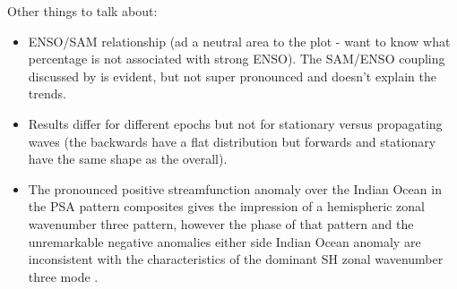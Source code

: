 Other things to talk about:
\begin{itemize}
\item ENSO/SAM relationship (ad a neutral area to the plot - want to know what percentage is not associated with strong ENSO). The SAM/ENSO coupling discussed by \citet{Fogt2006} is evident, but not super pronounced and doesn't explain the trends.
\item Results differ for different epochs but not for stationary versus propagating waves (the backwards have a flat distribution but forwards and stationary have the same shape as the overall).
\item The pronounced positive streamfunction anomaly over the Indian Ocean in the PSA pattern composites gives the impression of a hemispheric zonal wavenumber three pattern, however the phase of that pattern and the unremarkable negative anomalies either side Indian Ocean anomaly are inconsistent with the characteristics of the dominant SH zonal wavenumber three mode \citep[e.g.][]{Raphael2004,IrvingSimmonds2015}.
\end{itemize}


